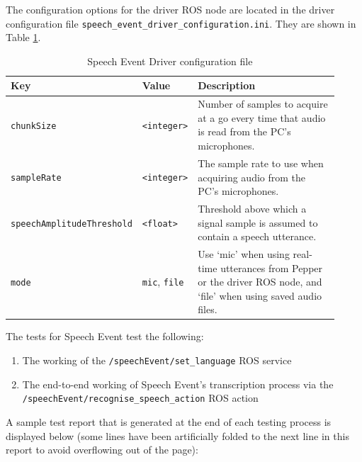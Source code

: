 \documentclass{CSSRforAfrica}
\begin{document}
The configuration options for the driver ROS node are located in the driver configuration file \texttt{speech\_event\_driver\_configuration.ini}. They are shown in Table \ref{table:driver-configuration}.

\begin{center}
\begin{table}[thb]
\begin{tabular}[thb]{|p{0.35\linewidth}|p{0.13\linewidth}|p{0.44\linewidth}|} \hline
\rowcolor{lightgray} Key & Value & Description \\ \hline
\texttt{chunkSize} & \texttt{<integer>} & Number of samples to acquire at a go every time that audio is read from the PC's microphones. \\ \hline
\texttt{sampleRate} & \texttt{<integer>} & The sample rate to use when acquiring audio from the PC's microphones. \\ \hline
\texttt{speechAmplitudeThreshold} & \texttt{<float>} & Threshold above which a signal sample is assumed to contain a speech utterance. \\ \hline
\texttt{mode} & \texttt{mic}, \texttt{file} & Use `mic' when using real-time utterances from Pepper or the driver ROS node, and `file' when using saved audio files. \\ \hline
\end{tabular}
\caption{Speech Event Driver configuration file}
\label{table:driver-configuration}
\end{table}
\end{center}

The tests for Speech Event test the following:

\begin{enumerate}
    \item The working of the \texttt{/speechEvent/set\_language} ROS service
    \item The end-to-end working of Speech Event's transcription process via the \\\texttt{/speechEvent/recognise\_speech\_action} ROS action
\end{enumerate}

A sample test report that is generated at the end of each testing process is displayed below (some lines have been artificially folded to the next line in this report to avoid overflowing out of the page):
\end{document}

